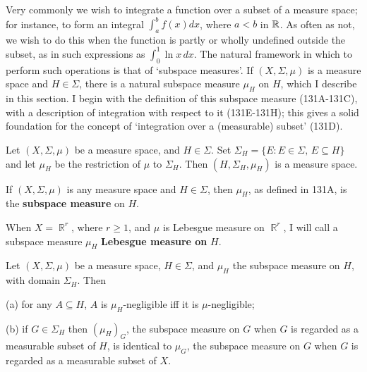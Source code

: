 
\def\chaptername{Complements}
\def\sectionname{Measurable subspaces}


Very commonly we wish to integrate a
function over a subset of a measure space;  for instance, to form an
integral $\int_a^bf(x)dx$, where $a<b$ in $\Bbb R$.   As often as not,
we wish to do this when the function is partly or wholly undefined
outside the subset, as in such expressions as $\int_0^1\ln x\,dx$.   The
natural framework in which to perform such operations is that of
`subspace measures'.   If $(X,\Sigma,\mu)$ is a measure space and
$H\in\Sigma$, there is a natural subspace measure $\mu_H$ on $H$,
which I describe in this section.
I begin with the definition of this subspace measure (131A-131C), with a
description of integration with respect to it (131E-131H);   this
gives a solid foundation for the concept of `integration over a
(measurable) subset' (131D).

 Let $(X,\Sigma,\mu)$ be a measure space, and
$H\in\Sigma$.   Set $\Sigma_H=\{E:E\in\Sigma,\,E\subseteq H\}$ and let
$\mu_H$ be the restriction of $\mu$ to $\Sigma_H$.   Then
$(H,\Sigma_H,\mu_H)$ is a measure space.


 If $(X,\Sigma,\mu)$ is any measure space and
$H\in\Sigma$, then $\mu_H$, as defined in 131A, is the {\bf
subspace measure} on $H$.

When $X=\BbbR^r$, where $r\ge 1$, and $\mu$ is Lebesgue measure on
$\BbbR^r$, I will call a subspace measure $\mu_H$ {\bf Lebesgue measure on}
$H$.


 Let $(X,\Sigma,\mu)$ be a measure space,
$H\in\Sigma$, and $\mu_H$ the subspace measure on $H$, with domain
$\Sigma_H$. Then

(a) for any $A\subseteq H$, $A$ is $\mu_H$-negligible iff it is
$\mu$-negligible;

(b) if $G\in\Sigma_H$ then $(\mu_H)_G$, the subspace measure on $G$ when
$G$ is regarded as a measurable subset of $H$, is identical to $\mu_G$,
the subspace measure on $G$ when $G$ is regarded as a measurable subset
of $X$.

